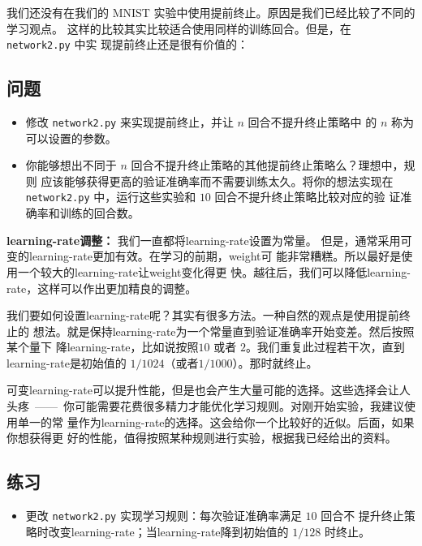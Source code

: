 我们还没有在我们的 MNIST 实验中使用提前终止。原因是我们已经比较了不同的学习观点。
这样的比较其实比较适合使用同样的训练回合。但是，在 \lstinline!network2.py! 中实
现提前终止还是很有价值的：

\subsection*{问题}

\begin{itemize}
\item 修改 \lstinline!network2.py! 来实现提前终止，并让 $n$ 回合不提升终止策略中
  的 $n$ 称为可以设置的参数。
\item 你能够想出不同于 $n$ 回合不提升终止策略的其他提前终止策略么？理想中，规则
  应该能够获得更高的验证准确率而不需要训练太久。将你的想法实现在
  \lstinline!network2.py! 中，运行这些实验和 $10$ 回合不提升终止策略比较对应的验
  证准确率和训练的回合数。
\end{itemize}

\textbf{\gls*{learning-rate}调整：} 我们一直都将\gls*{learning-rate}设置为常量。
但是，通常采用可变的\gls*{learning-rate}更加有效。在学习的前期，\gls*{weight}可
能非常糟糕。所以最好是使用一个较大的\gls*{learning-rate}让\gls*{weight}变化得更
快。越往后，我们可以降低\gls*{learning-rate}，这样可以作出更加精良的调整。

我们要如何设置\gls*{learning-rate}呢？其实有很多方法。一种自然的观点是使用提前终止的
想法。就是保持\gls*{learning-rate}为一个常量直到验证准确率开始变差。然后按照某个量下
降\gls*{learning-rate}，比如说按照$10$ 或者 $2$。我们重复此过程若干次，直到%
\gls*{learning-rate}是初始值的 $1/1024$（或者$1/1000$）。那时就终止。

可变\gls*{learning-rate}可以提升性能，但是也会产生大量可能的选择。这些选择会让人
头疼~——~你可能需要花费很多精力才能优化学习规则。对刚开始实验，我建议使用单一的常
量作为\gls*{learning-rate}的选择。这会给你一个比较好的近似。后面，如果你想获得更
好的性能，值得按照某种规则进行实验，根据我已经给出的资料。

\subsection*{练习}

\begin{itemize}
\item 更改 \lstinline!network2.py! 实现学习规则：每次验证准确率满足 $10$ 回合不
  提升终止策略时改变\gls*{learning-rate}；当\gls*{learning-rate}降到初始值的
  $1/128$ 时终止。
\end{itemize}

